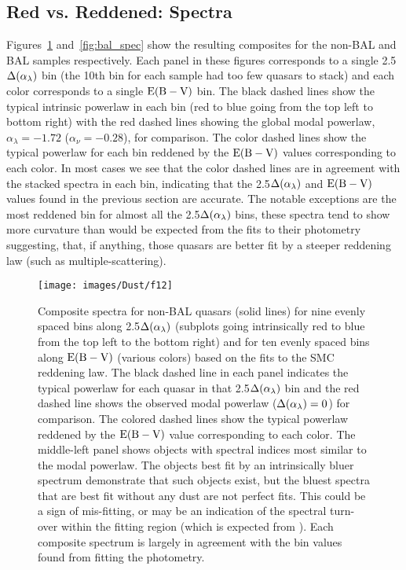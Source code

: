 \subsection{Red vs. Reddened: Spectra}
Figures~\ref{fig:spec} and~\ref{fig:bal_spec} show the resulting composites for the non-BAL and BAL samples respectively. Each panel in these figures corresponds to a single 2.5$\Delta(\alpha_{\lambda})$ bin (the 10th bin for each sample had too few quasars to stack) and each color corresponds to a single ${\rm E(B-V)}$ bin. The black dashed lines show the typical intrinsic powerlaw in each bin (red to blue going from the top left to bottom right) with the red dashed lines showing the global modal powerlaw, $\alpha_{\lambda}=-1.72$ ($\alpha_{\nu}=-0.28$), for comparison.  The color dashed lines show the typical powerlaw for each bin reddened by the ${\rm E(B-V)}$ values corresponding to each color.  In most cases we see that the color dashed lines are in agreement with the stacked spectra in each bin, indicating that the 2.5$\Delta(\alpha_{\lambda})$ and ${\rm E(B-V)}$ values found in the previous section are accurate.  The notable exceptions are the most reddened bin for almost all the 2.5$\Delta(\alpha_{\lambda})$ bins, these spectra tend to show more curvature than would be expected from the fits to their photometry suggesting, that, if anything, those quasars are better fit by a steeper reddening law (such as multiple-scattering). 

\begin{figure*}
\begin{center}
\texttt{[image: images/Dust/f12]}
\caption[Composite spectra for non-BAL quasars]{\label{fig:spec} Composite spectra for non-BAL quasars (solid lines) for nine evenly spaced bins along 2.5$\Delta(\alpha_{\lambda})$ (subplots going intrinsically red to blue from the top left to the bottom right) and for ten evenly spaced bins along ${\rm E(B-V)}$ (various colors) based on the fits to the SMC reddening law.  The black dashed line in each panel indicates the typical powerlaw for each quasar in that 2.5$\Delta(\alpha_{\lambda})$ bin and the red dashed line shows the observed modal powerlaw ($\Delta(\alpha_{\lambda})=0$) for comparison.  The colored dashed lines show the typical powerlaw reddened by the ${\rm E(B-V)}$ value corresponding to each color. The middle-left panel shows objects with spectral indices most similar to the modal powerlaw.  The objects best fit by an intrinsically bluer spectrum demonstrate that such objects exist, but the bluest spectra that are best fit without any dust are not perfect fits.  This could be a sign of mis-fitting, or may be an indication of the spectral turn-over within the fitting region (which is expected from \citet{Shang:2005}).  Each composite spectrum is largely in agreement with the bin values found from fitting the photometry.}
\end{center}
\end{figure*}

